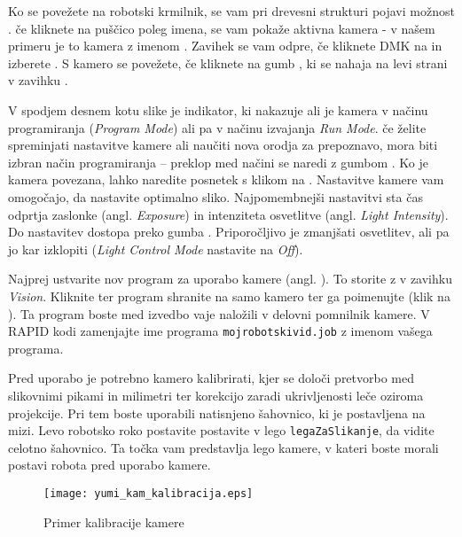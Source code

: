 Ko se povežete na robotski krmilnik, se vam pri drevesni strukturi pojavi možnost . če kliknete na puščico poleg imena, se vam pokaže aktivna kamera - v našem primeru je to kamera z imenom . Zavihek  se vam odpre, če kliknete DMK na  in izberete . S kamero se povežete, če kliknete na gumb , ki se nahaja na levi strani v zavihku .

V spodjem desnem kotu slike je indikator, ki nakazuje ali je kamera v načinu programiranja (\emph{Program Mode}) ali pa v načinu izvajanja {\emph{Run Mode}}. če želite spreminjati nastavitve kamere ali naučiti nova orodja za prepoznavo, mora biti izbran način programiranja -- preklop med načini se naredi z gumbom .
Ko je kamera povezana, lahko naredite posnetek s klikom na . Nastavitve kamere vam omogočajo, da nastavite optimalno sliko. Najpomembnejši nastavitvi sta čas odprtja zaslonke (angl. \emph{Exposure}) in intenziteta osvetlitve (angl. \emph{Light Intensity}). Do nastavitev dostopa preko gumba . Priporočljivo je zmanjšati osvetlitev, ali pa jo kar izklopiti (\emph{Light Control Mode} nastavite na \emph{Off}).

Najprej ustvarite nov program za uporabo kamere (angl. ). To storite z  v zavihku \emph{Vision}. Kliknite  ter program shranite na samo kamero ter ga poimenujte (klik na ). Ta program boste med izvedbo vaje naložili v delovni pomnilnik kamere. V RAPID kodi zamenjajte ime programa \verb"mojrobotskivid.job" z imenom vašega programa.

Pred uporabo je potrebno kamero kalibrirati, kjer se določi pretvorbo med slikovnimi pikami in milimetri ter korekcijo zaradi ukrivljenosti leče oziroma projekcije. Pri tem boste uporabili natisnjeno šahovnico, ki je postavljena na mizi. Levo robotsko roko postavite postavite v lego \verb"legaZaSlikanje", da vidite celotno šahovnico. Ta točka vam predstavlja lego kamere, v kateri boste morali postavi robota pred uporabo kamere.

\begin{figure}[!tb]
\centering
\texttt{[image: yumi\_kam\_kalibracija.eps]}
\caption{Primer kalibracije kamere}
\label{fig:yumi_kam_kalib}
\end{figure}


